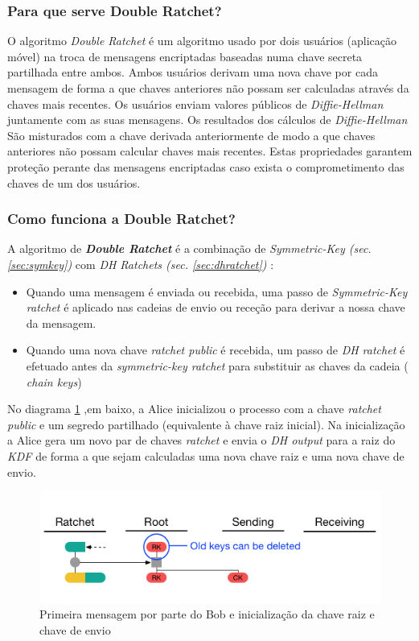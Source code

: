 \subsubsection{Para que serve Double Ratchet?}
O algoritmo \emph{Double Ratchet} é um algoritmo usado por dois usuários (aplicação móvel) na troca de mensagens encriptadas baseadas numa chave secreta partilhada entre ambos. Ambos usuários derivam uma nova chave por cada mensagem de forma a que chaves anteriores não possam ser calculadas através da chaves mais recentes. Os usuários enviam valores públicos de \emph{Diffie-Hellman} juntamente com as suas mensagens. Os resultados dos cálculos de \emph{Diffie-Hellman} São misturados com a chave derivada anteriormente de modo a que chaves anteriores não possam calcular chaves mais recentes. Estas propriedades garantem proteção perante das mensagens encriptadas caso exista o comprometimento das chaves de um dos usuários.

\subsubsection{Como funciona a Double Ratchet?}
A algoritmo de \textit{\textbf{Double Ratchet}} é a combinação de \textit{Symmetric-Key (sec.\ref{sec:symkey})} com \textit{DH Ratchets (sec. \ref{sec:dhratchet})} :

\begin{itemize}
    \item Quando uma mensagem é enviada ou recebida, uma passo de \textit{Symmetric-Key ratchet} é aplicado nas cadeias de envio ou receção para derivar a nossa chave da mensagem.
    \item Quando uma nova chave \textit{ratchet public} é recebida, um passo de \textit{DH ratchet} é efetuado antes da \textit{symmetric-key ratchet} para substituir as chaves da cadeia ( \textit{chain keys})
\end{itemize}

No diagrama \ref{diagram:DR1} ,em baixo, a Alice inicializou o processo com a chave \textit{ratchet public} e um segredo partilhado (equivalente à chave raiz inicial). Na inicialização a Alice gera um novo par de chaves \textit{ratchet} e envia o \textit{DH output} para a raiz do \textit{KDF} de forma a que sejam calculadas uma nova chave raiz e uma nova chave de envio.

\begin{figure}[H]
\begin{center}
\includegraphics[width=12cm]{img/DR1.png}
\caption{Primeira mensagem por parte do Bob e inicialização da chave raiz e chave de envio}
\label{diagram:DR1}
\centering
\end{center}
\end{figure}

